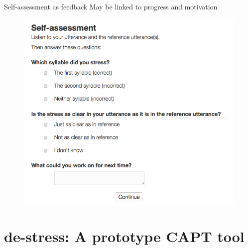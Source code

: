\documentclass[xcolor={dvipsnames}]{beamer}
\newcommand{\TODO}[1]{{\color{red}\textbf{[TODO #1]}}}
\begin{document}
		\begin{frame}{Self-assessment as feedback}
		May be linked to progress and motivation
		
		\begin{figure}
		\includegraphics[height=0.7\textheight]{selfAssessment}
		\end{figure}
		\end{frame}

	
\section{de-stress: A prototype CAPT tool }
		
\end{document}
